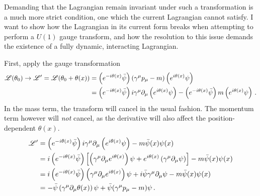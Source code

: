     Demanding that the Lagrangian remain invariant under such a transformation is a much more strict condition,
        one which the current Lagrangian cannot satisfy.
    I want to show how the Lagrangian in its current form breaks when attempting to perform a $U(1)$ gauge transform,
        and how the resolution to this issue demands the existence of a fully dynamic, interacting Lagrangian.

    First, apply the gauge transformation
    \begin{equation} \begin{split}
        \mathscr{L}(\theta_0) \to \mathscr{L}' = \mathscr{L}(\theta_0+\theta(x)) &=
            \left( e^{-i\theta(x)} \bar{\psi} \right) (\gamma^\mu p_\mu - m) \left( e^{i\theta(x)}\psi \right)
            \\ &= \left( e^{-i\theta(x)} \bar{\psi} \right) i\gamma^\mu \partial_\mu \left( e^{i\theta(x)}\psi \right)
                - \left( e^{-i\theta(x)} \bar{\psi} \right) m \left( e^{i\theta(x)}\psi \right)
        \,.
    \end{split} \end{equation}
    In the mass term, the transform will cancel in the usual fashion.
    The momentum term however will \textit{not} cancel, as the derivative will also affect the position-dependent $\theta(x)$.
    \begin{equation} \begin{split}
        \mathscr{L}' &= \left( e^{-i\theta(x)} \bar{\psi} \right) i\gamma^\mu \partial_\mu \left( e^{i\theta(x)}\psi \right) - m \bar{\psi}(x) \psi(x)
        \\ &= i \left( e^{-i\theta(x)} \bar{\psi} \right) \left[
                \left( \gamma^\mu \partial_\mu e^{i\theta(x)} \right) \psi 
                + e^{i\theta(x)} \left( \gamma^\mu \partial_\mu \psi \right)
            \right] - m \bar{\psi}(x) \psi(x)
        \\ &= i \left( e^{-i\theta(x)} \bar{\psi} \right)
                \left( \gamma^\mu \partial_\mu e^{i\theta(x)} \right) \psi 
            + i \bar{\psi} \gamma^\mu \partial_\mu \psi
            - m \bar{\psi}(x) \psi(x)
        \\ &= - \bar{\psi} \left( \gamma^\mu \partial_\mu\theta(x) \right) \psi 
            + \bar{\psi} ( \gamma^\mu p_\mu - m ) \psi
        \,.
    \end{split} \end{equation}

